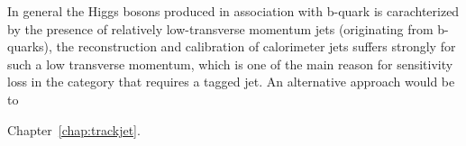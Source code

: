 In general the Higgs bosons produced in association with b-quark is carachterized by the presence of relatively low-transverse momentum
jets (originating from b-quarks), the reconstruction and calibration of calorimeter jets suffers strongly for such a low transverse
momentum, which is one of the main reason for sensitivity loss in the category that requires a tagged jet.
An alternative approach would be to 

Chapter~\ref{chap:trackjet}.

